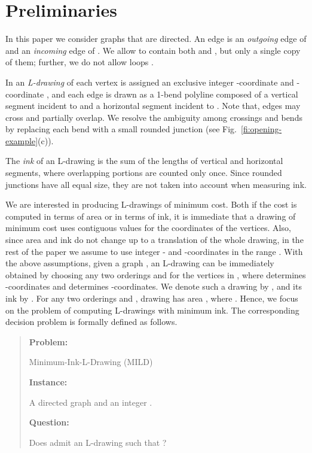 \documentclass{llncs}
\begin{document}
\section{Preliminaries}\label{se:preliminaries}

In this paper we consider graphs  that are directed. An edge  is an \emph{outgoing} edge of  and an \emph{incoming} edge of . We allow  to contain both  and , but only a single copy of them; further, we do not allow loops .  

In an \emph{L-drawing}  of  each vertex  is assigned an exclusive integer -coordinate  and -coordinate , and each edge  is drawn as a 1-bend polyline composed of a vertical segment incident to  and a horizontal segment incident to . Note that, edges may cross and partially overlap. We resolve the ambiguity among crossings and bends by replacing each bend with a small rounded junction (see Fig.~\ref{fi:opening-example}(c)).

The \emph{ink}  of an L-drawing  is the sum of the lengths of vertical and horizontal segments, where overlapping portions are counted only once. Since rounded junctions have all equal size, they are not taken into account when measuring ink.

We are interested in producing L-drawings of minimum cost. Both if the cost is computed in terms of area or in terms of ink, it is immediate that a drawing of minimum cost uses contiguous values for the coordinates of the vertices. Also, since area and ink do not change up to a translation of the whole drawing, in the rest of the paper we assume to use integer - and -coordinates in the range .   
With the above assumptions, given a graph , an L-drawing can be immediately obtained by choosing any two orderings  and  for the vertices in , where  determines -coordinates and  determines -coordinates. We denote such a drawing by , and its ink by . For any two orderings  and , drawing  has area , where . 
Hence, we focus on the problem of computing L-drawings with minimum ink. The corresponding decision problem is formally defined as follows.

\begin{quote}
{\bf Problem:} 
\begin{minipage}[t]{.90\linewidth} 
{\sc Minimum-Ink-L-Drawing (MILD)}
\end{minipage}\par\vspace{2pt}
{\bf Instance:} 
\begin{minipage}[t]{.90\linewidth} 
A directed graph  and an integer .
\end{minipage}\par\vspace{2pt}
{\bf Question:} 
\begin{minipage}[t]{.90\linewidth} 
Does  admit an L-drawing  such that ?
\end{minipage}
\end{quote}
\end{document}
